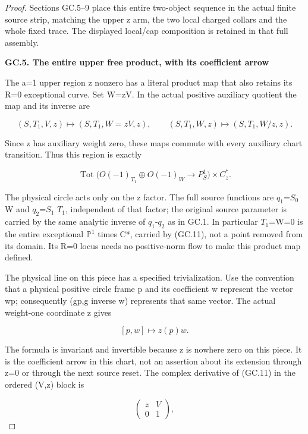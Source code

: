 \begin{proof}
Sections GC.5--9 place this entire two-object sequence in the
actual finite source strip, matching the upper z arm, the two
local charged collars and the whole fixed trace. The displayed
local/cap composition is retained in that full assembly.

\par

\medskip\noindent\textbf{GC.5. The entire upper free product, with its coefficient arrow}

\par\nobreak

The a=1 upper region z nonzero has a literal product map that
also retains its R=0 exceptional curve. Set W=zV. In the actual
positive auxiliary quotient the map and its inverse are

\[
 (S,T_1,V,z)\longmapsto(S,T_1,W=zV,z),\qquad
 (S,T_1,W,z)\longmapsto(S,T_1,W/z,z).
 \tag{GC.11}
\]

Since z has auxiliary weight zero, these maps commute with every
auxiliary chart transition. Thus this region is exactly

\[
 \operatorname{Tot}\bigl(O(-1)_{T_1}\oplus O(-1)_W
          \longrightarrow P^1_S\bigr)\times C^*_z.
 \tag{GC.12}
\]

The physical circle acts only on the z factor. The full source
functions are \(q_1\)=\(S_0\) W and \(q_2\)=\(S_1\) \(T_1\), independent of that factor;
the original source parameter is carried by the same analytic
inverse of \(q_1\)-\(q_2\) as in GC.1. In particular \(T_1\)=W=0 is the entire
exceptional \(\mathbb P^1\) times C*, carried by (GC.11), not a point removed
from its domain. Its R=0 locus needs no positive-norm flow to
make this product map defined.

The physical line on this piece has a specified trivialization.
Use the convention that a physical positive circle frame p and
its coefficient w represent the vector wp; consequently
(gp,g inverse w) represents that same vector. The actual
weight-one coordinate z gives

\[
                  [p,w]\longmapsto z(p)w.             \tag{GC.13}
\]

The formula is invariant and invertible because z is nowhere
zero on this piece. It is the coefficient arrow in this chart,
not an assertion about its extension through z=0 or through the
next source reset. The complex derivative of (GC.11) in the
ordered (V,z) block is

\[
              \begin{pmatrix}z&V\\0&1\end{pmatrix},
 \tag{GC.14}
\]


\end{proof}

